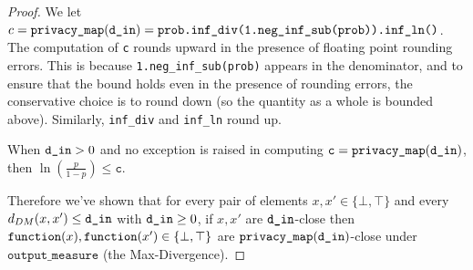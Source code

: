 \documentclass{article}
\begin{document}
\begin{proof}
We let $c = \texttt{privacy\_map}(\texttt{d\_in}) = \texttt{prob.inf\_div(1.neg\_inf\_sub(prob)).inf\_ln()}$. 
The computation of \texttt{c} rounds upward in the presence of floating point rounding errors.  
This is because \texttt{1.neg\_inf\_sub(prob)} appears in the denominator, and to ensure that the bound holds even in the presence of rounding errors, the conservative choice is to round down (so the quantity as a whole is bounded above).  
Similarly, \texttt{inf\_div} and \texttt{inf\_ln} round up.  
 
When $\texttt{d\_in} > 0$ and no exception is raised in computing $\texttt{c} = \texttt{privacy\_map}(\texttt{d\_in})$, then $\ln\left(\frac{p}{1 - p}\right) \leq \texttt{c}$.  
 
Therefore we've shown that for every pair of elements $x, x' \in \{\bot, \top\}$ and every $d_{DM}(x, x') \le \texttt{d\_in}$ with $\texttt{d\_in} \ge 0$,  
if $x, x'$ are $\texttt{d\_in}$-close then $\texttt{function}(x),\texttt{function}(x') \in \{\bot, \top\}$ are $\texttt{privacy\_map}(\texttt{d\_in})$-close under $\texttt{output\_measure}$ (the Max-Divergence). 
\end{proof} 
 
 
 
 
 
\end{document}

